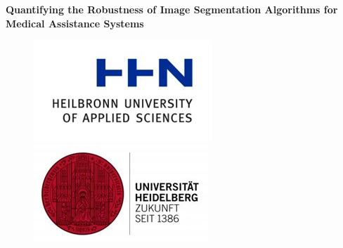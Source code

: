 \documentclass[11pt, a4paper,onecolumn ,titlepage]{article}
\begin{document}
    \begin{titlepage}
        \begin{center}


            \vspace*{1cm}

            {\large \textbf{Quantifying the Robustness of Image Segmentation Algorithms for Medical Assistance Systems}}

            \vspace{1.5cm}

            \begin{figure}[H]
                \centering
                \begin{minipage}[b]{.4\linewidth} %
                    \includegraphics[width=\linewidth]{Title/hhn}
                \end{minipage}\label{fig:unis}
                \hspace{.005\linewidth}%
                \begin{minipage}[b]{.4\linewidth} %
                    \includegraphics[width=\linewidth]{Title/hd}
                \end{minipage}\label{fig:umut}
                \hspace{.005\linewidth}%


\end{figure}
\end{center}
\end{titlepage}
\end{document}
